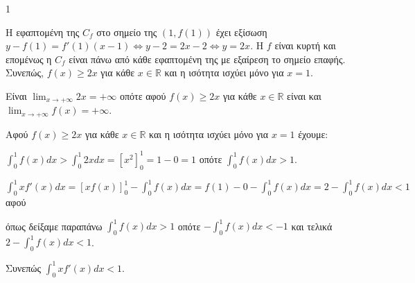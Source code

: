 \begin{ylh}{1}
    \item [Ύλη από εικόνα]
\end{ylh}
\begin{alist}
    \item Η εφαπτομένη της $C_f$ στο σημείο της $(1,f(1))$ έχει εξίσωση $y - f(1) = f'(1)(x-1) \Leftrightarrow y-2=2x-2 \Leftrightarrow y=2x$.
    Η $f$ είναι κυρτή και επομένως η $C_f$ είναι πάνω από κάθε εφαπτομένη της με εξαίρεση το σημείο επαφής. Συνεπώς, $f(x) \ge 2x$ για κάθε $x \in \mathbb{R}$ και η ισότητα ισχύει μόνο για $x=1$.
    \item Είναι $\lim_{x \to +\infty} 2x = +\infty$ οπότε αφού $f(x) \ge 2x$ για κάθε $x \in \mathbb{R}$ είναι και $\lim_{x \to +\infty} f(x) = +\infty$.
    \item Αφού $f(x) \ge 2x$ για κάθε $x \in \mathbb{R}$ και η ισότητα ισχύει μόνο για $x=1$ έχουμε:
    \begin{rlist}
        \item $\int_{0}^{1} f(x)dx > \int_{0}^{1} 2xdx = [x^2]_{0}^{1} = 1-0=1$ οπότε $\int_{0}^{1} f(x)dx > 1$.
        \item $\int_{0}^{1} xf'(x)dx = [xf(x)]_{0}^{1} - \int_{0}^{1} f(x)dx = f(1)-0 - \int_{0}^{1} f(x)dx = 2 - \int_{0}^{1} f(x)dx < 1$ αφού

        όπως δείξαμε παραπάνω $\int_{0}^{1} f(x)dx > 1$ οπότε $-\int_{0}^{1} f(x)dx < -1$ και τελικά $2 - \int_{0}^{1} f(x)dx < 1$.

        Συνεπώς $\int_{0}^{1} xf'(x)dx < 1$.
    \end{rlist}
\end{alist}